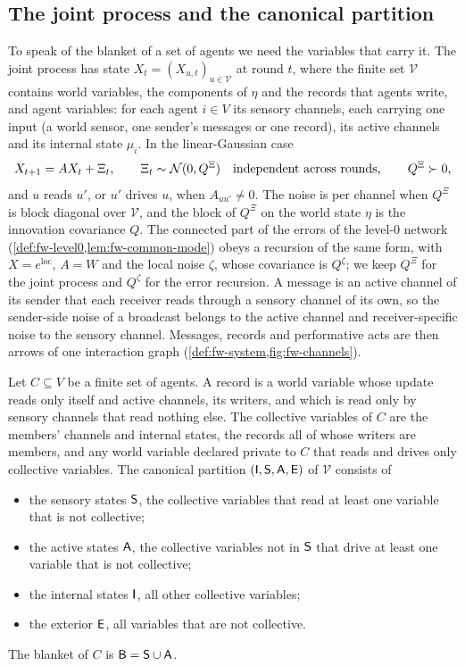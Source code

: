 \subsection{The joint process and the canonical partition}\label{sec:col-partition}

To speak of the blanket of a set of agents we need the variables that carry it. The joint process has state $X_t=(X_{u,t})_{u\in\mathcal V}$ at round $t$, where the finite set $\mathcal V$ contains world variables, the components of $\eta$ and the records that agents write, and agent variables: for each agent $i\in V$ its sensory channels, each carrying one input (a world sensor, one sender's messages or one record), its active channels and its internal state $\mu_i$. In the linear-Gaussian case
\begin{equation}\label{eq:col-joint}
X_{t+1}=AX_t+\Xi_t,\qquad\Xi_t\sim\mathcal{N}(0,Q^{\Xi})\quad\text{independent across rounds},\qquad Q^{\Xi}\succ0,
\end{equation}
and $u$ reads $u'$, or $u'$ drives $u$, when $A_{uu'}\neq0$. The noise is per channel when $Q^{\Xi}$ is block diagonal over $\mathcal V$, and the block of $Q^{\Xi}$ on the world state $\eta$ is the innovation covariance $Q$. The connected part of the errors of the level-0 network (\cref{def:fw-level0,lem:fw-common-mode}) obeys a recursion of the same form, with $X=e^{\mathrm{loc}}$, $A=W$ and the local noise $\zeta$, whose covariance is $Q^\zeta$; we keep $Q^{\Xi}$ for the joint process and $Q^\zeta$ for the error recursion. A message is an active channel of its sender that each receiver reads through a sensory channel of its own, so the sender-side noise of a broadcast belongs to the active channel and receiver-specific noise to the sensory channel. Messages, records and performative acts are then arrows of one interaction graph (\cref{def:fw-system,fig:fw-channels}).

\begin{definition}\label{def:col-partition}
Let $C\subseteq V$ be a finite set of agents. A record is a world variable whose update reads only itself and active channels, its writers, and which is read only by sensory channels that read nothing else. The collective variables of $C$ are the members' channels and internal states, the records all of whose writers are members, and any world variable declared private to $C$ that reads and drives only collective variables. The canonical partition $(\mathsf{I},\mathsf{S},\mathsf{A},\mathsf{E})$ of $\mathcal V$ consists of
\begin{itemize}
\item the sensory states $\mathsf{S}$, the collective variables that read at least one variable that is not collective;
\item the active states $\mathsf{A}$, the collective variables not in $\mathsf{S}$ that drive at least one variable that is not collective;
\item the internal states $\mathsf{I}$, all other collective variables;
\item the exterior $\mathsf{E}$, all variables that are not collective.
\end{itemize}
The blanket of $C$ is $\mathsf{B}=\mathsf{S}\cup\mathsf{A}$.
\end{definition}

